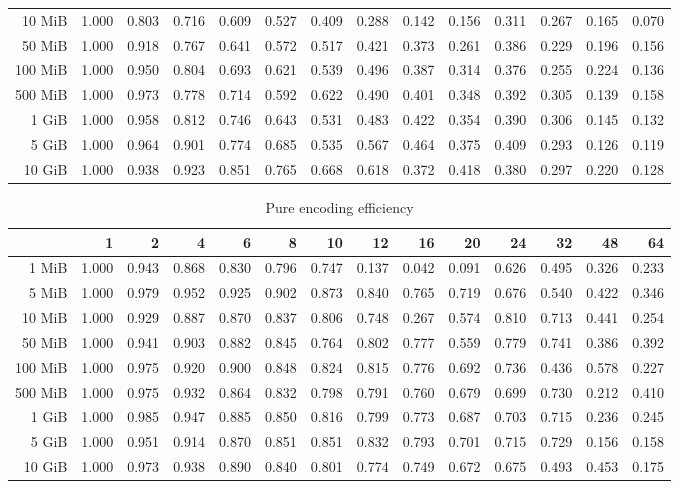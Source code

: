 \begin{centering}
\begin{table}[!h]
\begin{tabular}{rrrrrrrrrrrrrr}
		10 MiB  & 1.000 & 0.803 & 0.716 & 0.609 & 0.527 & 0.409 & 0.288 & 0.142 & 0.156 & 0.311 & 0.267 & 0.165 & 0.070 \\
		50 MiB  & 1.000 & 0.918 & 0.767 & 0.641 & 0.572 & 0.517 & 0.421 & 0.373 & 0.261 & 0.386 & 0.229 & 0.196 & 0.156 \\
		100 MiB & 1.000 & 0.950 & 0.804 & 0.693 & 0.621 & 0.539 & 0.496 & 0.387 & 0.314 & 0.376 & 0.255 & 0.224 & 0.136 \\
		500 MiB & 1.000 & 0.973 & 0.778 & 0.714 & 0.592 & 0.622 & 0.490 & 0.401 & 0.348 & 0.392 & 0.305 & 0.139 & 0.158 \\
		1 GiB   & 1.000 & 0.958 & 0.812 & 0.746 & 0.643 & 0.531 & 0.483 & 0.422 & 0.354 & 0.390 & 0.306 & 0.145 & 0.132 \\
		5 GiB   & 1.000 & 0.964 & 0.901 & 0.774 & 0.685 & 0.535 & 0.567 & 0.464 & 0.375 & 0.409 & 0.293 & 0.126 & 0.119 \\
		10 GiB  & 1.000 & 0.938 & 0.923 & 0.851 & 0.765 & 0.668 & 0.618 & 0.372 & 0.418 & 0.380 & 0.297 & 0.220 & 0.128 \\
		\bottomrule
	\end{tabular}
\end{table}
\begin{table}[!h]
	\caption{Pure encoding efficiency}
	\begin{tabular}{rrrrrrrrrrrrrr}
		\toprule
		\diagbox[width=7em]{Size}{Threads} &    1  &    2  &    4  &    6  &    8  &    10 &    12 &    16 &    20 &    24 &    32 &    48 &    64 \\
		\midrule
		1 MiB   & 1.000 & 0.943 & 0.868 & 0.830 & 0.796 & 0.747 & 0.137 & 0.042 & 0.091 & 0.626 & 0.495 & 0.326 & 0.233 \\
		5 MiB   & 1.000 & 0.979 & 0.952 & 0.925 & 0.902 & 0.873 & 0.840 & 0.765 & 0.719 & 0.676 & 0.540 & 0.422 & 0.346 \\
		10 MiB  & 1.000 & 0.929 & 0.887 & 0.870 & 0.837 & 0.806 & 0.748 & 0.267 & 0.574 & 0.810 & 0.713 & 0.441 & 0.254 \\
		50 MiB  & 1.000 & 0.941 & 0.903 & 0.882 & 0.845 & 0.764 & 0.802 & 0.777 & 0.559 & 0.779 & 0.741 & 0.386 & 0.392 \\
		100 MiB & 1.000 & 0.975 & 0.920 & 0.900 & 0.848 & 0.824 & 0.815 & 0.776 & 0.692 & 0.736 & 0.436 & 0.578 & 0.227 \\
		500 MiB & 1.000 & 0.975 & 0.932 & 0.864 & 0.832 & 0.798 & 0.791 & 0.760 & 0.679 & 0.699 & 0.730 & 0.212 & 0.410 \\
		1 GiB   & 1.000 & 0.985 & 0.947 & 0.885 & 0.850 & 0.816 & 0.799 & 0.773 & 0.687 & 0.703 & 0.715 & 0.236 & 0.245 \\
		5 GiB   & 1.000 & 0.951 & 0.914 & 0.870 & 0.851 & 0.851 & 0.832 & 0.793 & 0.701 & 0.715 & 0.729 & 0.156 & 0.158 \\
		10 GiB  & 1.000 & 0.973 & 0.938 & 0.890 & 0.840 & 0.801 & 0.774 & 0.749 & 0.672 & 0.675 & 0.493 & 0.453 & 0.175 \\
		\bottomrule
	\end{tabular}
\end{table}
\end{centering}
